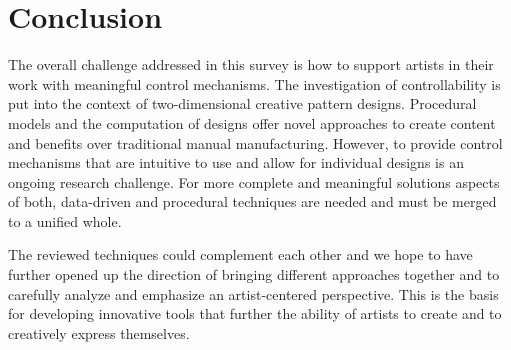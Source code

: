 

\section{Conclusion}
\label{sec:conclusion}


The overall challenge addressed in this survey is how to support artists in their work with meaningful control mechanisms. The investigation of controllability is put into the context of two-dimensional creative pattern designs. Procedural models and the computation of designs offer novel approaches to create content and benefits over traditional manual manufacturing. However, to provide control mechanisms that are intuitive to use and allow for individual designs is an ongoing research challenge. For more complete and meaningful solutions aspects of both, data-driven and procedural techniques are needed and must be merged to a unified whole.  

The reviewed techniques could complement each other and we hope to have further opened up the direction of bringing different approaches together and to carefully analyze and emphasize an artist-centered perspective. This is the basis for developing innovative tools that further the ability of artists to create and to creatively express themselves.



